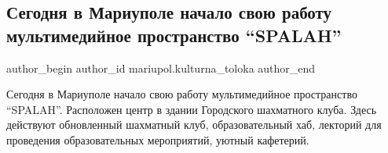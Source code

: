  
 
 
 
 

\subsection{Сегодня в Мариуполе начало свою работу мультимедийное пространство \enquote{SPALAH}}
\label{sec:18_01_2019.fb.mariupol.kulturna_toloka.1.multimedia_prostranstvo_spalah}

\ifcmt
 author_begin
   author_id mariupol.kulturna_toloka
 author_end
\fi

Сегодня в Мариуполе начало свою работу мультимедийное пространство \enquote{SPALAH}.
Расположен центр в здании  Городского шахматного клуба. Здесь действуют
обновленный шахматный клуб, образовательный хаб, лекторий для проведения
образовательных мероприятий, уютный кафетерий.
